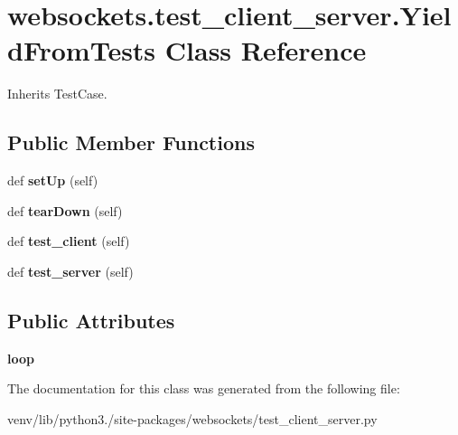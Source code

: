 \hypertarget{classwebsockets_1_1test__client__server_1_1_yield_from_tests}{}\section{websockets.\+test\+\_\+client\+\_\+server.\+Yield\+From\+Tests Class Reference}
\label{classwebsockets_1_1test__client__server_1_1_yield_from_tests}


Inherits Test\+Case.

\subsection*{Public Member Functions}
\begin{DoxyCompactItemize}
\item 
\mbox{\label{classwebsockets_1_1test__client__server_1_1_yield_from_tests_a2603fee46435e9610d330f3a5ca7fe4c}} 
def {\bfseries set\+Up} (self)
\item 
\mbox{\label{classwebsockets_1_1test__client__server_1_1_yield_from_tests_a0be177661591085d961152e726ff57fc}} 
def {\bfseries tear\+Down} (self)
\item 
\mbox{\label{classwebsockets_1_1test__client__server_1_1_yield_from_tests_a0e5fdda62a3fcdbb159148dc00f0040e}} 
def {\bfseries test\+\_\+client} (self)
\item 
\mbox{\label{classwebsockets_1_1test__client__server_1_1_yield_from_tests_ab2c47de4ce164977d17d43b32dddaaad}} 
def {\bfseries test\+\_\+server} (self)
\end{DoxyCompactItemize}
\subsection*{Public Attributes}
\begin{DoxyCompactItemize}
\item 
\mbox{\label{classwebsockets_1_1test__client__server_1_1_yield_from_tests_a84174ff6f77a69ad578ad6eea937fd42}} 
{\bfseries loop}
\end{DoxyCompactItemize}


The documentation for this class was generated from the following file\+:\begin{DoxyCompactItemize}
\item 
venv/lib/python3./site-\/packages/websockets/test\+\_\+client\+\_\+server.\+py\end{DoxyCompactItemize}
